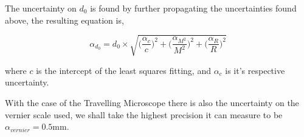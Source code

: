\documentclass[twocolumn]{revtex4}
\begin{document}
The uncertainty on $d_0$ is found by further propagating the uncertainties found above, the resulting equation is, 

\begin{equation} \tag{7}
\alpha_{d_0}=d_0\times\sqrt{\Big(\frac{\alpha_c}{c}\Big)^2 + \Big(\frac{\alpha_{M^2}}{M^2}\Big)^2 + \Big(\frac{\alpha_R}{R}\Big)^2}
\end{equation}

where $c$ is the intercept of the least squares fitting, and $\alpha_c$ is it's respective uncertainty.

With the case of the Travelling Microscope there is also the uncertainty on the vernier scale used, we shall take the highest precision it can measure to be $\alpha_{vernier}=0.5$mm.

\clearpage

\end{document}
